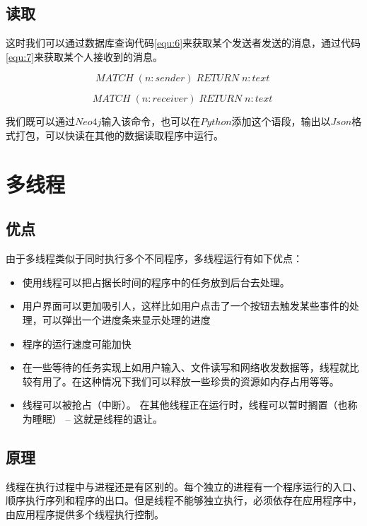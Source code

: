 \documentclass[forprint]{OSPaper}
\begin{document}
\subsection{读取}
这时我们可以通过数据库查询代码\ref{equ:6}来获取某个发送者发送的消息，通过代码\ref{equ:7}来获取某个人接收到的消息。

\begin{equation}
	\label{equ:6}
	MATCH \; (n:sender) \; RETURN \; n:text \;
\end{equation}

\begin{equation}
	\label{equ:7}
	MATCH \; (n:receiver) \; RETURN \; n:text \;
\end{equation}

我们既可以通过$Neo4j$输入该命令，也可以在$Python$添加这个语段，输出以$Json$格式打包，可以快读在其他的数据读取程序中运行。

\section{多线程}
\subsection{优点}

由于多线程类似于同时执行多个不同程序，多线程运行有如下优点：

\begin{itemize}
	\item 使用线程可以把占据长时间的程序中的任务放到后台去处理。
	\item 用户界面可以更加吸引人，这样比如用户点击了一个按钮去触发某些事件的处理，可以弹出一个进度条来显示处理的进度
	\item 程序的运行速度可能加快
	\item 在一些等待的任务实现上如用户输入、文件读写和网络收发数据等，线程就比较有用了。在这种情况下我们可以释放一些珍贵的资源如内存占用等等。
	\item 线程可以被抢占（中断）。
	在其他线程正在运行时，线程可以暂时搁置（也称为睡眠） -- 这就是线程的退让。
\end{itemize}

\subsection{原理}

线程在执行过程中与进程还是有区别的。每个独立的进程有一个程序运行的入口、顺序执行序列和程序的出口。但是线程不能够独立执行，必须依存在应用程序中，由应用程序提供多个线程执行控制。
\end{document}
